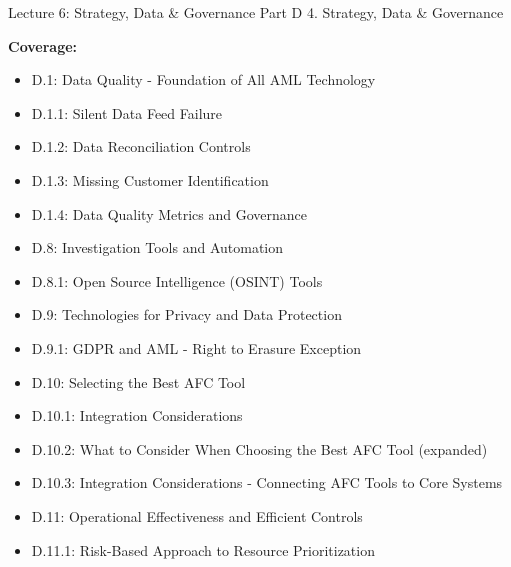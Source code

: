 \documentclass[11pt,a4paper]{beamer}
\begin{document}
\begin{frame}{Lecture 6: Strategy, Data \& Governance}
	\centering
	\Large Part D 4. Strategy, Data \& Governance
	\vspace{0.5cm}
	
	\textbf{Coverage:}
	\begin{itemize}
		\item D.1: Data Quality - Foundation of All AML Technology
		\item D.1.1: Silent Data Feed Failure
		\item D.1.2: Data Reconciliation Controls
		\item D.1.3: Missing Customer Identification
		\item D.1.4: Data Quality Metrics and Governance
		\item D.8: Investigation Tools and Automation
		\item D.8.1: Open Source Intelligence (OSINT) Tools
		\item D.9: Technologies for Privacy and Data Protection
		\item D.9.1: GDPR and AML - Right to Erasure Exception
		\item D.10: Selecting the Best AFC Tool
		\item D.10.1: Integration Considerations
		\item D.10.2: What to Consider When Choosing the Best AFC Tool (expanded)
		\item D.10.3: Integration Considerations - Connecting AFC Tools to Core Systems
		\item D.11: Operational Effectiveness and Efficient Controls
		\item D.11.1: Risk-Based Approach to Resource Prioritization
	\end{itemize}
\end{frame}
\end{document}
